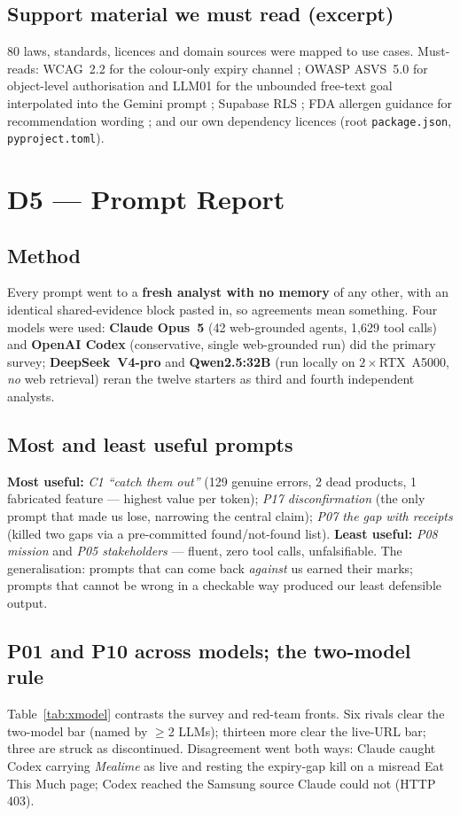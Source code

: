 \documentclass[sigconf,nonacm]{acmart}
\begin{document}
\subsection{Support material we must read (excerpt)}
80 laws, standards, licences and domain sources were mapped to use cases. Must-reads:
WCAG~2.2 for the colour-only expiry channel \cite{wcag22}; OWASP ASVS~5.0 for
object-level authorisation \cite{asvs} and LLM01 for the unbounded free-text goal
interpolated into the Gemini prompt \cite{llm01}; Supabase RLS \cite{supabaserls};
FDA allergen guidance for recommendation wording \cite{fda}; and our own
dependency licences (root \texttt{package.json}, \texttt{pyproject.toml}).

\section{D5 --- Prompt Report}
\subsection{Method}
Every prompt went to a \textbf{fresh analyst with no memory} of any other, with an
identical shared-evidence block pasted in, so agreements mean something. Four
models were used: \textbf{Claude Opus~5} (42 web-grounded agents, 1{,}629 tool
calls) and \textbf{OpenAI Codex} (conservative, single web-grounded run) did the
primary survey; \textbf{DeepSeek~V4-pro} and \textbf{Qwen2.5:32B} (run locally on
$2\times$RTX~A5000, \emph{no} web retrieval) reran the twelve starters as
third and fourth independent analysts.

\subsection{Most and least useful prompts}
\textbf{Most useful:} \emph{C1 ``catch them out''} (129 genuine errors, 2 dead
products, 1 fabricated feature --- highest value per token); \emph{P17
disconfirmation} (the only prompt that made us lose, narrowing the central claim);
\emph{P07 the gap with receipts} (killed two gaps via a pre-committed
found/not-found list). \textbf{Least useful:} \emph{P08 mission} and \emph{P05
stakeholders} --- fluent, zero tool calls, unfalsifiable. The generalisation:
prompts that can come back \emph{against} us earned their marks; prompts that
cannot be wrong in a checkable way produced our least defensible output.

\subsection{P01 and P10 across models; the two-model rule}
Table~\ref{tab:xmodel} contrasts the survey and red-team fronts. Six rivals clear
the two-model bar (named by $\geq$2 LLMs); thirteen more clear the live-URL bar;
three are struck as discontinued. Disagreement went both ways: Claude caught Codex
carrying \emph{Mealime} as live and resting the expiry-gap kill on a misread Eat
This Much page; Codex reached the Samsung source Claude could not (HTTP 403).
\end{document}
